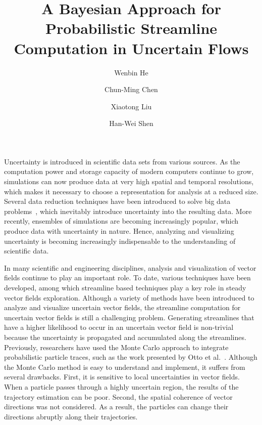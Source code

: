 \documentclass{vgtc}                          %
\title{A Bayesian Approach for Probabilistic Streamline Computation in Uncertain Flows}
\author{Wenbin He %
\and Chun-Ming Chen %
\and Xiaotong Liu
\and Han-Wei Shen}
\affiliation{\scriptsize The Ohio State University\thanks{e-mail: \{he.495,chen.1701,liu.1952,shen.94\}@osu.edu}}
\begin{document}


\maketitle

Uncertainty is introduced in scientific data sets from various sources. As the computation power and storage capacity of modern computers continue to grow, simulations can now produce data at very high spatial and temporal resolutions, which makes it necessary to choose a representation for analysis at a reduced size. Several data reduction techniques have been introduced to solve big data problems~\cite{6378985, 7156380, conf/ldav/LiuLBP12, DBLP:conf/ldav/ThompsonLBBGPP11}, which inevitably introduce uncertainty into the resulting data. More recently, ensembles of simulations are becoming increasingly popular, which produce data with uncertainty in nature. Hence, analyzing and visualizing uncertainty is becoming increasingly indispensable to the understanding of scientific data.

In many scientific and engineering disciplines, analysis and visualization of vector fields continue to play an important role. To date, various techniques have been developed, among which streamline based techniques play a key role in steady vector fields exploration. Although a variety of methods have been introduced to analyze and visualize uncertain vector fields, the streamline computation for uncertain vector fields is still a challenging problem. Generating streamlines that have a higher likelihood to occur in an uncertain vector field is non-trivial because the uncertainty is propagated and accumulated along the streamlines. Previously, researchers have used the Monte Carlo approach to integrate probabilistic particle traces, such as the work presented by Otto et al.~\cite{Otto10a, Otto11a}. Although the Monte Carlo method is easy to understand and implement, it suffers from several drawbacks. First, it is sensitive to local uncertainties in vector fields. When a particle passes through a highly uncertain region, the results of the trajectory estimation can be poor. Second, the spatial coherence of vector directions was not considered. As a result, the particles can change their directions abruptly along their trajectories.
\end{document}
